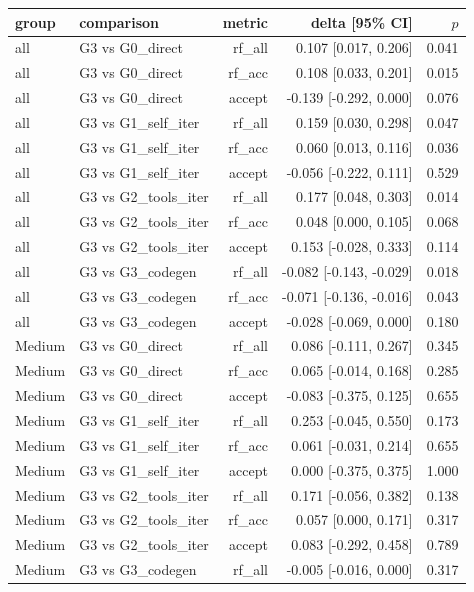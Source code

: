 \begin{tabular}{llrrr}
\toprule
group & comparison & metric & delta [95\% CI] & $p$ \\
\midrule
all & G3 vs G0\_direct & rf\_all & 0.107 [0.017, 0.206] & 0.041 \\
all & G3 vs G0\_direct & rf\_acc & 0.108 [0.033, 0.201] & 0.015 \\
all & G3 vs G0\_direct & accept & -0.139 [-0.292, 0.000] & 0.076 \\
all & G3 vs G1\_self\_iter & rf\_all & 0.159 [0.030, 0.298] & 0.047 \\
all & G3 vs G1\_self\_iter & rf\_acc & 0.060 [0.013, 0.116] & 0.036 \\
all & G3 vs G1\_self\_iter & accept & -0.056 [-0.222, 0.111] & 0.529 \\
all & G3 vs G2\_tools\_iter & rf\_all & 0.177 [0.048, 0.303] & 0.014 \\
all & G3 vs G2\_tools\_iter & rf\_acc & 0.048 [0.000, 0.105] & 0.068 \\
all & G3 vs G2\_tools\_iter & accept & 0.153 [-0.028, 0.333] & 0.114 \\
all & G3 vs G3\_codegen & rf\_all & -0.082 [-0.143, -0.029] & 0.018 \\
all & G3 vs G3\_codegen & rf\_acc & -0.071 [-0.136, -0.016] & 0.043 \\
all & G3 vs G3\_codegen & accept & -0.028 [-0.069, 0.000] & 0.180 \\
Medium & G3 vs G0\_direct & rf\_all & 0.086 [-0.111, 0.267] & 0.345 \\
Medium & G3 vs G0\_direct & rf\_acc & 0.065 [-0.014, 0.168] & 0.285 \\
Medium & G3 vs G0\_direct & accept & -0.083 [-0.375, 0.125] & 0.655 \\
Medium & G3 vs G1\_self\_iter & rf\_all & 0.253 [-0.045, 0.550] & 0.173 \\
Medium & G3 vs G1\_self\_iter & rf\_acc & 0.061 [-0.031, 0.214] & 0.655 \\
Medium & G3 vs G1\_self\_iter & accept & 0.000 [-0.375, 0.375] & 1.000 \\
Medium & G3 vs G2\_tools\_iter & rf\_all & 0.171 [-0.056, 0.382] & 0.138 \\
Medium & G3 vs G2\_tools\_iter & rf\_acc & 0.057 [0.000, 0.171] & 0.317 \\
Medium & G3 vs G2\_tools\_iter & accept & 0.083 [-0.292, 0.458] & 0.789 \\
Medium & G3 vs G3\_codegen & rf\_all & -0.005 [-0.016, 0.000] & 0.317 \\

\end{tabular}
